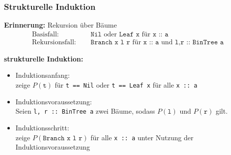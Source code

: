 \documentclass{beamer}
\begin{document}
\begin{frame} \frametitle{Strukturelle Induktion}
	\footnotesize
	
	\textbf{Erinnerung:} Rekursion über Bäume
	\begin{equation*}
		\begin{aligned}
			\text{Basisfall: } \quad &\texttt{Nil} \text{ oder } \texttt{Leaf x} \text{ für } \texttt{x :: a} \\
			\text{Rekursionsfall: }\quad &\texttt{Branch x l r} \text{ für } \texttt{x :: a} \text{ und } \texttt{l,r :: BinTree a}
		\end{aligned}
	\end{equation*}
	
	\begin{center}
	\end{center}
	
	\textbf{strukturelle Induktion:} \vspace{-0.5\baselineskip}
	\begin{itemize}
		\item \textcolor{cdblue}{Induktionsanfang}: \\
		zeige $P(\texttt{t})$ für \texttt{t == Nil} oder \texttt{t == Leaf x} für alle \texttt{x :: a}
		\item \textcolor{cdblue}{Induktionsvoraussetzung}:\\
		Seien \texttt{l, r :: BinTree a} zwei Bäume, sodass $P(\texttt{l})$ und $P(\texttt{r})$ gilt.
		\item \textcolor{cdblue}{Induktionsschritt}: \\
		zeige $P(\texttt{Branch x l r})$ für alle \texttt{x :: a} unter Nutzung der Induktionsvoraussetzung
	\end{itemize}
	
\end{frame}
\end{document}
